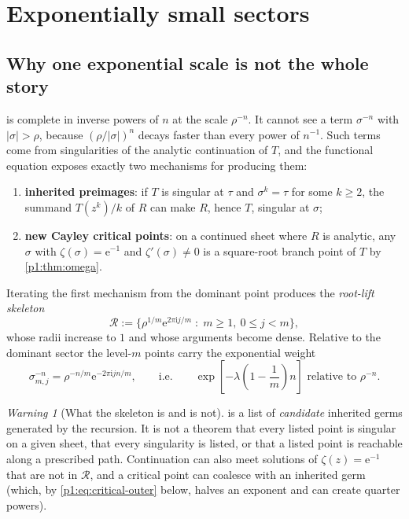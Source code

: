 \documentclass[11pt,a4paper,oneside]{book}
\theoremstyle{plain}
\theoremstyle{definition}
\theoremstyle{remark}
\newtheorem{warning}[theorem]{Warning}
\newcommand{\e}{\mathrm{e}}
\newcommand{\ii}{\mathrm{i}}
\begin{document}
\section{Exponentially small sectors}
\label{p1:sec:sectors}

\subsection{Why one exponential scale is not the whole story}

 is complete in inverse powers of $n$ at the scale $\rho^{-n}$.  It cannot
see a term $\sigma^{-n}$ with $|\sigma|>\rho$, because $(\rho/|\sigma|)^{n}$ decays faster
than every power of $n^{-1}$. Such terms come from singularities of the analytic continuation
of $T$, and the functional equation exposes exactly two mechanisms for producing them:
\begin{enumerate}
\item \textbf{inherited preimages}: if $T$ is singular at $\tau$ and
      $\sigma^{k}=\tau$ for some $k\ge2$, the summand $T(z^{k})/k$ of $R$ can
      make $R$, hence $T$, singular at $\sigma$;
\item \textbf{new Cayley critical points}: on a continued sheet where $R$ is
      analytic, any $\sigma$ with $\zeta(\sigma)=\e^{-1}$ and
      $\zeta'(\sigma)\ne0$ is a square-root branch point of $T$ by
      \cref{p1:thm:omega}.
\end{enumerate}
Iterating the first mechanism from the dominant point produces the \emph{root-lift skeleton}
\begin{equation}
 \mathscr R:=\bigl\{\rho^{1/m}\e^{2\pi\ii j/m}\;:\;m\ge1,\ 0\le j<m\bigr\},
 \label{p1:eq:skeleton}
\end{equation}
whose radii increase to $1$ and whose arguments become dense.  Relative to the dominant sector
the level-$m$ points carry the exponential weight
\begin{equation}
 \sigma_{m,j}^{-n}=\rho^{-n/m}\e^{-2\pi\ii jn/m},
 \qquad\text{i.e.}\qquad
 \exp\!\left[-\lambda\left(1-\frac1m\right)n\right]
 \text{ relative to }\rho^{-n}.
 \label{p1:eq:skeleton-scale}
\end{equation}

\begin{warning}[What the skeleton is and is not]
\label{p1:rem:skeleton}
 is a list of \emph{candidate} inherited germs generated by the
recursion.  It is not a theorem that every listed point is singular on a given sheet, that
every singularity is listed, or that a listed point is reachable along a prescribed path.
Continuation can also meet solutions of $\zeta(z)=\e^{-1}$ that are not in $\mathscr R$, and a
critical point can coalesce with an inherited germ (which, by \cref{p1:eq:critical-outer}
below, halves an exponent and can create quarter powers).
\end{warning}
\end{document}
